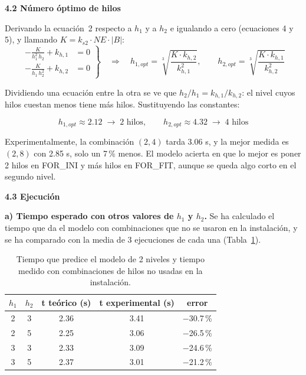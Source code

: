 \documentclass[12pt]{article}
\begin{document}
\begin{enumerate}
\medskip
\noindent\textbf{4.2 Número óptimo de hilos}\par
\smallskip

Derivando la ecuación~2 respecto a $h_1$ y a $h_2$ e igualando a cero (ecuaciones 4 y 5), y llamando $K = k_{s2} \cdot NE \cdot |B|$:
\[
\left.
\begin{aligned}
-\frac{K}{h_1^2 \, h_2} + k_{h,1} &= 0 \\
-\frac{K}{h_1 \, h_2^2} + k_{h,2} &= 0
\end{aligned}
\right\}
\quad\Rightarrow\quad
h_{1,opt} = \sqrt[3]{\frac{K \cdot k_{h,2}}{k_{h,1}^2}}, \qquad
h_{2,opt} = \sqrt[3]{\frac{K \cdot k_{h,1}}{k_{h,2}^2}}
\]

Dividiendo una ecuación entre la otra se ve que $h_2 / h_1 = k_{h,1} / k_{h,2}$: el nivel cuyos hilos cuestan menos tiene más hilos. Sustituyendo las constantes:

\[
h_{1,opt} \approx 2.12 \;\rightarrow\; 2 \text{ hilos}, \qquad h_{2,opt} \approx 4.32 \;\rightarrow\; 4 \text{ hilos}
\]

Experimentalmente, la combinación $(2, 4)$ tarda 3.06 s, y la mejor medida es $(2, 8)$ con 2.85 s, solo un 7\,\% menos. El modelo acierta en que lo mejor es poner 2 hilos en FOR\_INI y más hilos en FOR\_FIT, aunque se queda algo corto en el segundo nivel.

\medskip
\noindent\textbf{4.3 Ejecución}\par
\smallskip

\textbf{a) Tiempo esperado con otros valores de $h_1$ y $h_2$.} Se ha calculado el tiempo que da el modelo con combinaciones que no se usaron en la instalación, y se ha comparado con la media de 3 ejecuciones de cada una (Tabla~\ref{tab:c4_prediccion}).

\begin{table}[htbp]
\centering
\begin{tabular}{cc|ccc}
\toprule
\textbf{$h_1$} & \textbf{$h_2$} & \textbf{t teórico (s)} & \textbf{t experimental (s)} & \textbf{error} \\
\midrule
2 & 3 & 2.36 & 3.41 & $-$30.7\,\% \\
2 & 5 & 2.25 & 3.06 & $-$26.5\,\% \\
3 & 3 & 2.33 & 3.09 & $-$24.6\,\% \\
3 & 5 & 2.37 & 3.01 & $-$21.2\,\% \\
\bottomrule
\end{tabular}
\caption{Tiempo que predice el modelo de 2 niveles y tiempo medido con combinaciones de hilos no usadas en la instalación.}
\label{tab:c4_prediccion}
\end{table}


\end{enumerate}
\end{document}

